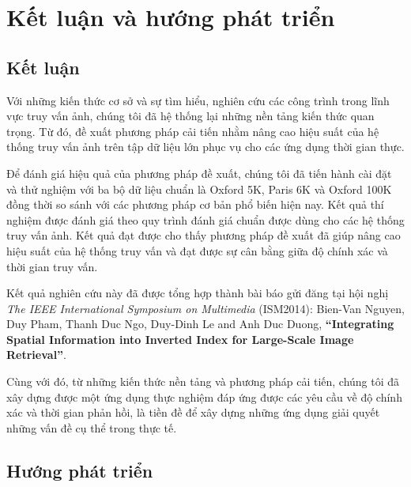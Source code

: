 \def\baselinestretch{1}
\chapter{Kết luận và hướng phát triển}
\label{chapter:summarize}
\ifpdf
    \graphicspath{{Conclusions/ConclusionsFigs/PNG/}{Conclusions/ConclusionsFigs/PDF/}{Conclusions/ConclusionsFigs/}}
\else
    \graphicspath{{Conclusions/ConclusionsFigs/EPS/}{Conclusions/ConclusionsFigs/}}
\fi


\section{Kết luận}
Với những kiến thức cơ sở và sự tìm hiểu, nghiên cứu các công trình trong lĩnh vực truy vấn ảnh, chúng tôi đã hệ thống lại những nền tảng kiến thức quan trọng. Từ đó, đề xuất phương pháp cải tiến nhằm nâng cao hiệu suất của hệ thống truy vấn ảnh trên tập dữ liệu lớn phục vụ cho các ứng dụng thời gian thực.

Để đánh giá hiệu quả của phương pháp đề xuất, chúng tôi đã tiến hành cài đặt và thử nghiệm với ba bộ dữ liệu chuẩn là Oxford 5K, Paris 6K và Oxford 100K đồng thời so sánh với các phương pháp cơ bản phổ biến hiện nay. Kết quả thí nghiệm được đánh giá theo quy trình đánh giá chuẩn được dùng cho các hệ thống truy vấn ảnh. Kết quả đạt được cho thấy phương pháp đề xuất đã giúp nâng cao hiệu suất của hệ thống truy vấn và đạt được sự cân bằng giữa độ chính xác và thời gian truy vấn.

Kết quả nghiên cứu này đã được tổng hợp thành bài báo gửi đăng tại hội nghị \textit{The IEEE International Symposium on Multimedia} (ISM2014):  Bien-Van Nguyen, Duy Pham, Thanh Duc Ngo, Duy-Dinh Le and Anh Duc Duong, \textbf{``Integrating Spatial Information into Inverted Index for Large-Scale Image Retrieval''}.

Cùng với đó, từ những kiến thức nền tảng và phương pháp cải tiến, chúng tôi đã xây dựng được một ứng dụng thực nghiệm đáp ứng được các yêu cầu về độ chính xác và thời gian phản hồi, là tiền đề để xây dựng những ứng dụng giải quyết những vấn đề cụ thể trong thực tế.


\section{Hướng phát triển}
